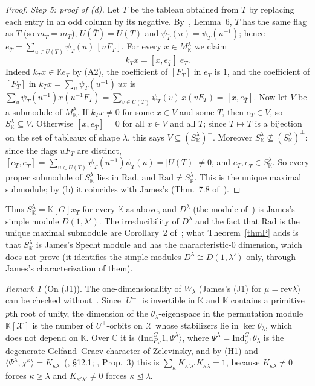 \documentclass[11pt, letterpaper]{amsart}
\theoremstyle{definition}
\theoremstyle{remark}
\newtheorem{remark}{Remark}
\newcommand{\KK}{\mathbb{K}}
\newcommand{\CC}{\mathbb{C}}
\newcommand{\rev}{\mathrm{rev}}
\newcommand{\Ind}{\mathrm{Ind}}
\newcommand{\domeq}{\trianglelefteq}
\begin{document}
\begin{proof}
\emph{Step 5: proof of (d).} Let $\bar T$ be the tableau obtained from $T$ by replacing each entry in an odd column by its negative. By~\cite{AN2}, Lemma~6, $\bar T$ has the same flag as $T$ (so $m_{\bar T}=m_T$), $U(\bar T)=U(T)$ and $\psi_{\bar T}(u)=\psi_T(u^{-1})$; hence $e_{\bar T}=\sum_{u\in U(T)}\psi_T(u)\,[uF_T]$. For every $x\in M^\lambda_\KK$ we claim
\[
k_Tx=[x,e_{\bar T}]\;e_T .
\]
Indeed $k_Tx\in\KK e_T$ by (A2), the coefficient of $[F_T]$ in $e_T$ is $1$, and the coefficient of $[F_T]$ in $k_Tx=\sum_u\psi_T(u^{-1})\,ux$ is $\sum_u\psi_T(u^{-1})x(u^{-1}F_T)=\sum_{v\in U(T)}\psi_T(v)\,x(vF_T)=[x,e_{\bar T}]$. Now let $V$ be a submodule of $M^\lambda_\KK$. If $k_Tx\ne0$ for some $x\in V$ and some $T$, then $e_T\in V$, so $S^\lambda_\KK\subseteq V$. Otherwise $[x,e_{\bar T}]=0$ for all $x\in V$ and all $T$; since $T\mapsto\bar T$ is a bijection on the set of tableaux of shape $\lambda$, this says $V\subseteq(S^\lambda_\KK)^\perp$. Moreover $S^\lambda_\KK\not\subseteq(S^\lambda_\KK)^\perp$: since the flags $uF_T$ are distinct, $[e_T,e_{\bar T}]=\sum_{u\in U(T)}\psi_T(u^{-1})\psi_T(u)=|U(T)|\ne0$, and $e_T,e_{\bar T}\in S^\lambda_\KK$. So every proper submodule of $S^\lambda_\KK$ lies in $\mathrm{Rad}$, and $\mathrm{Rad}\ne S^\lambda_\KK$. This is the unique maximal submodule; by (b) it coincides with James's (Thm.~7.8 of~\cite{Jam86}).
\end{proof}

Thus $S^\lambda_\KK=\KK[G]x_T$ for every $\KK$ as above, and $D^\lambda$ (the module of~\cite{AN2}) is James's simple module $D(1,\lambda')$. The irreducibility of $D^\lambda$ and the fact that $\mathrm{Rad}$ is the unique maximal submodule are Corollary~2 of~\cite{AN2}; what Theorem~\ref{thmP} adds is that $S^\lambda_\KK$ is James's Specht module and has the characteristic-$0$ dimension, which~\cite{AN2} does not prove (it identifies the simple modules $D^\lambda\cong D(1,\lambda')$ only, through James's characterization of them).

\begin{remark}[On (J1)]\label{remJ1}
The one-dimensionality of $W_\lambda$ (James's (J1) for $\mu=\rev\lambda$) can be checked without~\cite{Jam86}. Since $|U^+|$ is invertible in $\KK$ and $\KK$ contains a primitive $p$th root of unity, the dimension of the $\theta_\lambda$-eigenspace in the permutation module $\KK[\mathcal X]$ is the number of $U^+$-orbits on $\mathcal X$ whose stabilizers lie in $\ker\theta_\lambda$, which does not depend on $\KK$. Over $\CC$ it is $\langle\Ind_{P_{\lambda'}}^G1,\Psi^\lambda\rangle$, where $\Psi^\lambda=\Ind_{U^+}^G\theta_\lambda$ is the degenerate Gelfand--Graev character of Zelevinsky, and by (H1) and $\langle\Psi^\lambda,\chi^\kappa\rangle=K_{\kappa\lambda}$~(\cite{Z}, \S12.1; \cite{AN2}, Prop.~3) this is $\sum_\kappa K_{\kappa'\lambda'}K_{\kappa\lambda}=1$, because $K_{\kappa\lambda}\ne0$ forces $\kappa\trianglerighteq\lambda$ and $K_{\kappa'\lambda'}\ne0$ forces $\kappa\domeq\lambda$.
\end{remark}
\end{document}
